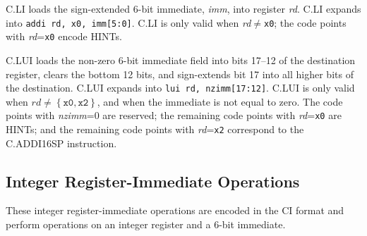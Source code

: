 C.LI loads the sign-extended 6-bit immediate, {\em imm}, into
register {\em rd}.
C.LI expands into {\tt addi rd, x0, imm[5:0]}.
C.LI is only valid when {\em rd}$\neq${\tt x0};
the code points with {\em rd}={\tt x0} encode HINTs.

C.LUI loads the non-zero 6-bit immediate field into bits 17--12 of the
destination register, clears the bottom 12 bits, and sign-extends bit
17 into all higher bits of the destination.
C.LUI expands into {\tt lui rd, nzimm[17:12]}.
C.LUI is only valid when
$\textit{rd}{\neq}{\left\{\texttt{x0},\texttt{x2}\right\}}$,
and when the immediate is not equal to zero.
The code points with {\em nzimm}=0 are reserved; the remaining code points
with {\em rd}={\tt x0} are HINTs; and the remaining code points with
{\em rd}={\tt x2} correspond to the C.ADDI16SP instruction.

\subsection*{Integer Register-Immediate Operations}

These integer register-immediate operations are encoded in the CI
format and perform operations on an integer register and
a 6-bit immediate.

